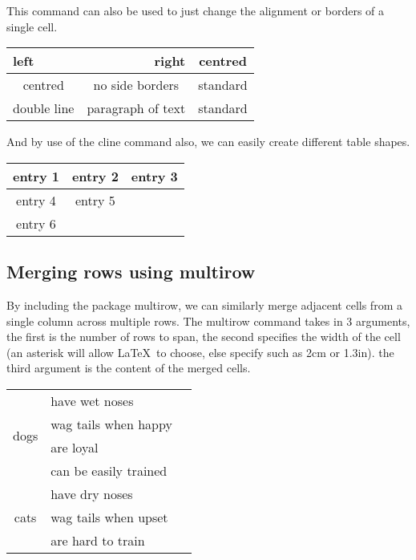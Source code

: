 \documentclass[a4paper,11pt]{article}
\begin{document}
This command can also be used to just change the alignment or borders of a single cell.
%
\begin{table}[hbtp]
  \centering
  \begin{tabular}{|c|c|c|}
    \hline
    \multicolumn{1}{|l|}{left } & \multicolumn{1}{|r|}{right }      & centred \\
	\hline
	centred                               & \multicolumn{1}{c}{no side borders}        & standard\\
	\hline
	\multicolumn{1}{||c||}{double line} & \multicolumn{1}{|p{1in}|}{paragraph of text} & standard\\
	\hline
  \end{tabular}
\end{table}

And by use of the cline command also, we can easily create different table shapes.
%
\begin{table}[hbtp]
	\centering
	\begin{tabular}{|c|c|c|}
		\hline
		entry 1 & entry 2 & entry 3 \\
		\hline
		entry 4 & entry 5 & \multicolumn{1}{c}{}\\
		\cline{1-2}
		entry 6 & \multicolumn{2}{l}{} \\
		\cline{1-1}
	\end{tabular}
\end{table}

\pagebreak

\subsection{Merging rows using multirow}

By including the package multirow, we can similarly merge adjacent cells from a single column across multiple rows. The multirow command takes in 3 arguments, the first is the number of rows to span, the second specifies the width of the cell (an asterisk will allow \LaTeX\ to choose, else specify such as 2cm or 1.3in). the third argument is the content of the merged cells.
%
\begin{table}[!hbtp]
	\centering
	\begin{tabular}{| c | l | l |}
		\hline
		\multirow{4}{*}{dogs} 	& have wet noses \\
                      			& wag tails when happy \\
                      			& are loyal     \\
                      			& can be easily trained\\
		\hline
		\multirow{3}{*}{cats} 	& have dry noses \\
		\cline{2-2} %
                      			& wag tails when upset\\
		\cline{2-2}
                      			& are hard to train\\
		\hline
	\end{tabular}
\end{table}
\end{document}
